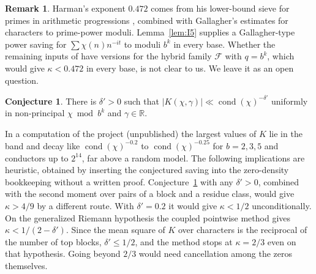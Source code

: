 \documentclass[11pt]{amsart}
\theoremstyle{definition}
\newtheorem{conjecture}[theorem]{Conjecture}
\newtheorem{remark}[theorem]{Remark}
\numberwithin{equation}{section}
\newcommand{\cF}{\mathcal{F}}
\newcommand{\cond}{\operatorname{cond}}
\begin{document}
\begin{remark}\label{rem:harman}
Harman's exponent $0.472$ comes from his lower-bound sieve for primes in arithmetic progressions \cite{Har05}, combined with Gallagher's estimates for characters to prime-power moduli. Lemma~\ref{lem:I5} supplies a Gallagher-type power saving for $\sum\chi(n)n^{-it}$ to moduli $b^k$ in every base. Whether the remaining inputs of \cite{Har05} have versions for the hybrid family $\cF$ with $q=b^k$, which would give $\kappa<0.472$ in every base, is not clear to us. We leave it as an open question.
\end{remark}

\begin{conjecture}\label{conj:K}
There is $\delta'>0$ such that $|K(\chi,\gamma)|\ll\cond(\chi)^{-\delta'}$ uniformly in non-principal $\chi\bmod b^k$ and $\gamma\in\mathbb R$.
\end{conjecture}

In a computation of the project (unpublished) the largest values of $K$ lie in the band and decay like $\cond(\chi)^{-0.2}$ to $\cond(\chi)^{-0.25}$ for $b=2,3,5$ and conductors up to $2^{14}$, far above a random model. The following implications are heuristic, obtained by inserting the conjectured saving into the zero-density bookkeeping without a written proof. Conjecture~\ref{conj:K} with any $\delta'>0$, combined with the second moment over pairs of a block and a residue class, would give $\kappa>4/9$ by a different route. With $\delta'=0.2$ it would give $\kappa<1/2$ unconditionally. On the generalized Riemann hypothesis the coupled pointwise method gives $\kappa<1/(2-\delta')$. Since the mean square of $K$ over characters is the reciprocal of the number of top blocks, $\delta'\le1/2$, and the method stops at $\kappa=2/3$ even on that hypothesis. Going beyond $2/3$ would need cancellation among the zeros themselves.
\end{document}
